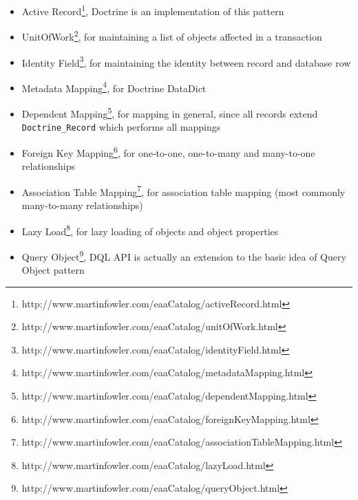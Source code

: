 \documentclass[11pt,a4paper]{report}
\begin{document}
\begin{itemize}
\item{Active Record\footnote{http://www.martinfowler.com/eaaCatalog/activeRecord.html}, Doctrine is an implementation of this pattern}
\item{UnitOfWork\footnote{http://www.martinfowler.com/eaaCatalog/unitOfWork.html}, for maintaining a list of objects affected in a transaction}
\item{Identity Field\footnote{http://www.martinfowler.com/eaaCatalog/identityField.html}, for maintaining the identity between record and database row}
\item{Metadata Mapping\footnote{http://www.martinfowler.com/eaaCatalog/metadataMapping.html}, for Doctrine DataDict}
\item{Dependent Mapping\footnote{http://www.martinfowler.com/eaaCatalog/dependentMapping.html}, for mapping in general, since all records extend \texttt{Doctrine\_Record} which performs all mappings}
\item{Foreign Key Mapping\footnote{http://www.martinfowler.com/eaaCatalog/foreignKeyMapping.html}, for one-to-one, one-to-many and many-to-one relationships}
\item{Association Table Mapping\footnote{http://www.martinfowler.com/eaaCatalog/associationTableMapping.html}, for association table mapping (most commonly many-to-many relationships)}
\item{Lazy Load\footnote{http://www.martinfowler.com/eaaCatalog/lazyLoad.html}, for lazy loading of objects and object properties}
\item{Query Object\footnote{http://www.martinfowler.com/eaaCatalog/queryObject.html}, DQL API is actually an extension to the basic idea of Query Object pattern}
\end{itemize}
\end{document}
